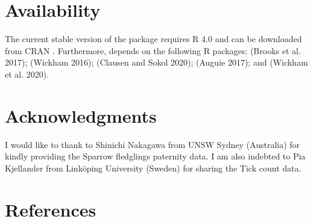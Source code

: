 \hypertarget{availability}{%
\section{Availability}\label{availability}}

The current stable version of the package requires R 4.0 and can be downloaded from CRAN \href{https://cran.r-project.org/web/packages/iccCounts/}{}. Furthermore,  depends on the following R packages:  (Brooks et al. 2017);  (Wickham 2016);  (Clausen and Sokol 2020);  (Auguie 2017); and  (Wickham et al. 2020).

\hypertarget{acknowledgments}{%
\section{Acknowledgments}\label{acknowledgments}}

I would like to thank to Shinichi Nakagawa from UNSW Sydney (Australia) for kindly providing the Sparrow fledglings paternity data. I am also indebted to Pia Kjellander from Linköping University (Sweden) for sharing the Tick count data.

\hypertarget{references}{%
\section*{References}\label{references}}

